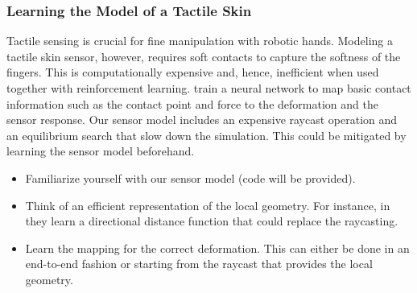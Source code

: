 \documentclass[a4paper]{article}
\begin{document}
\subsubsection{Learning the Model of a Tactile Skin}
Tactile sensing is crucial for fine manipulation with robotic hands. 
Modeling a tactile skin sensor, however, requires soft contacts to capture the softness of the fingers. 
This is computationally expensive and, hence, inefficient when used together with reinforcement learning. 
\citet{narang2021sim} train a neural network to map basic contact information such as the contact point and force to the deformation and the sensor response.
Our sensor model \cite{kasolowsky2024fine} includes an expensive raycast operation and an equilibrium search that slow down the simulation. 
This could be mitigated by learning the sensor model beforehand.
\begin{itemize}
  \item Familiarize yourself with our sensor model (code will be provided).
  \item Think of an efficient representation of the local geometry.
  For instance, in \cite{zobeidi2021deep} they learn a directional distance function that could replace the raycasting.
  \item Learn the mapping for the correct deformation. This can either be done in an end-to-end fashion or starting from the raycast that provides the local geometry.
\end{itemize}

\end{document}
